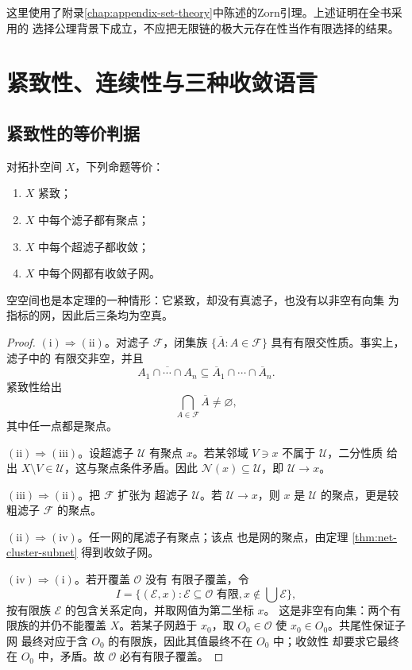 这里使用了附录\ref{chap:appendix-set-theory}中陈述的Zorn引理。上述证明在全书采用的
选择公理背景下成立，不应把无限链的极大元存在性当作有限选择的结果。

\section{紧致性、连续性与三种收敛语言}

\subsection{紧致性的等价判据}

\begin{theorem}[紧致性的网与滤子刻画]
\label{thm:compactness-nets-filters}
对拓扑空间 \(X\)，下列命题等价：
\begin{enumerate}[label=\textup{(\roman*)}]
 \item \(X\) 紧致；
 \item \(X\) 中每个滤子都有聚点；
 \item \(X\) 中每个超滤子都收敛；
 \item \(X\) 中每个网都有收敛子网。
\end{enumerate}
\end{theorem}

空空间也是本定理的一种情形：它紧致，却没有真滤子，也没有以非空有向集
为指标的网，因此后三条均为空真。

\begin{proof}
\((\mathrm i)\Rightarrow(\mathrm{ii})\)。对滤子 \(\mathcal F\)，闭集族
\(\{\overline A:A\in\mathcal F\}\) 具有有限交性质。事实上，滤子中的
有限交非空，并且
\[
 \overline{A_1\cap\cdots\cap A_n}
 \subseteq\overline A_1\cap\cdots\cap\overline A_n.
\]
紧致性给出
\[
 \bigcap_{A\in\mathcal F}\overline A\ne\varnothing,
\]
其中任一点都是聚点。

\((\mathrm{ii})\Rightarrow(\mathrm{iii})\)。设超滤子 \(\mathcal U\)
有聚点 \(x\)。若某邻域 \(V\ni x\) 不属于 \(\mathcal U\)，二分性质
给出 \(X\setminus V\in\mathcal U\)，这与聚点条件矛盾。因此
\(\mathcal N(x)\subseteq\mathcal U\)，即 \(\mathcal U\to x\)。

\((\mathrm{iii})\Rightarrow(\mathrm{ii})\)。把 \(\mathcal F\) 扩张为
超滤子 \(\mathcal U\)。若 \(\mathcal U\to x\)，则 \(x\) 是
\(\mathcal U\) 的聚点，更是较粗滤子 \(\mathcal F\) 的聚点。

\((\mathrm{ii})\Rightarrow(\mathrm{iv})\)。任一网的尾滤子有聚点；该点
也是网的聚点，由定理 \ref{thm:net-cluster-subnet} 得到收敛子网。

\((\mathrm{iv})\Rightarrow(\mathrm i)\)。若开覆盖 \(\mathcal O\) 没有
有限子覆盖，令
\[
 I=\{(\mathcal E,x):\mathcal E\subseteq\mathcal O\text{ 有限},
 x\notin\bigcup\mathcal E\},
\]
按有限族 \(\mathcal E\) 的包含关系定向，并取网值为第二坐标 \(x\)。
这是非空有向集：两个有限族的并仍不能覆盖 \(X\)。若某子网趋于
\(x_0\)，取 \(O_0\in\mathcal O\) 使 \(x_0\in O_0\)。共尾性保证子网
最终对应于含 \(O_0\) 的有限族，因此其值最终不在 \(O_0\) 中；收敛性
却要求它最终在 \(O_0\) 中，矛盾。故 \(\mathcal O\) 必有有限子覆盖。
\end{proof}

